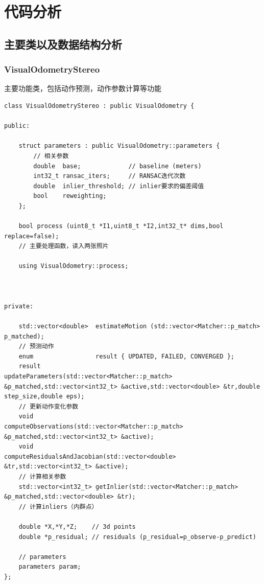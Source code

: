 \documentclass[UTF8]{ctexart}
\begin{document}
	\section{代码分析}
    \subsection{主要类以及数据结构分析}
    \subsubsection{VisualOdometryStereo}
    主要功能类，包括动作预测，动作参数计算等功能
    \begin{verbatim}
class VisualOdometryStereo : public VisualOdometry {

public:

    struct parameters : public VisualOdometry::parameters {
        // 相关参数
        double  base;             // baseline (meters)
        int32_t ransac_iters;     // RANSAC迭代次数
        double  inlier_threshold; // inlier要求的偏差阈值
        bool    reweighting;      
    };

    bool process (uint8_t *I1,uint8_t *I2,int32_t* dims,bool replace=false);
    // 主要处理函数，读入两张照片

    using VisualOdometry::process;



private:

    std::vector<double>  estimateMotion (std::vector<Matcher::p_match> p_matched);
    // 预测动作
    enum                 result { UPDATED, FAILED, CONVERGED };  
    result               updateParameters(std::vector<Matcher::p_match> &p_matched,std::vector<int32_t> &active,std::vector<double> &tr,double step_size,double eps);
    // 更新动作变化参数
    void                 computeObservations(std::vector<Matcher::p_match> &p_matched,std::vector<int32_t> &active);
    void                 computeResidualsAndJacobian(std::vector<double> &tr,std::vector<int32_t> &active);
    // 计算相关参数
    std::vector<int32_t> getInlier(std::vector<Matcher::p_match> &p_matched,std::vector<double> &tr);
    // 计算inliers（内群点）

    double *X,*Y,*Z;    // 3d points
    double *p_residual; // residuals (p_residual=p_observe-p_predict)
    
    // parameters
    parameters param;
};
    \end{verbatim}
\end{document}

